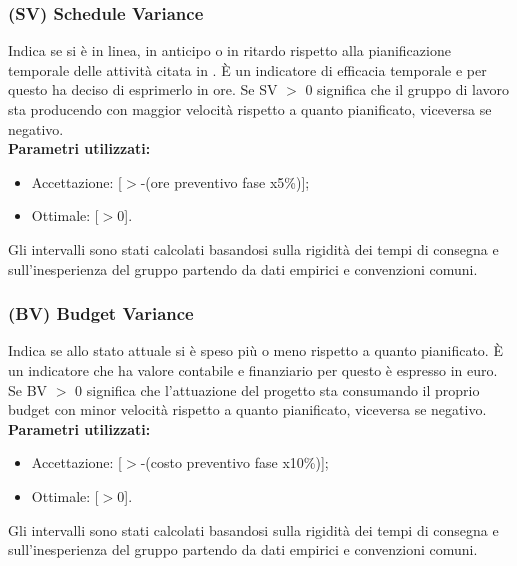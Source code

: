 \subsubsection{(SV) Schedule Variance}
Indica se si è in linea, in anticipo o in ritardo rispetto alla pianificazione temporale delle attività citata in \infoPDP.
È un indicatore di efficacia temporale e per questo \gruppo ha deciso di esprimerlo in ore.
Se SV $>$ 0 significa che il gruppo di lavoro sta producendo con maggior velocità rispetto a quanto pianificato, viceversa se negativo.\\
\textbf{Parametri utilizzati:}
\begin{itemize}
\item Accettazione: [$>$-(ore preventivo fase x5\%)];
\item Ottimale: [$>$0].
\end{itemize}
Gli intervalli sono stati calcolati basandosi sulla rigidità dei tempi di consegna e sull'inesperienza del gruppo partendo da dati empirici e convenzioni comuni.

\subsubsection{(BV) Budget Variance}
Indica se allo stato attuale si è speso più o meno rispetto a quanto pianificato.
È un indicatore che ha valore contabile e finanziario per questo è espresso in euro.
Se BV $>$ 0 significa che l’attuazione del progetto sta consumando il proprio budget con minor velocità rispetto a quanto pianificato, viceversa se negativo.
\textbf{Parametri utilizzati:}\\
\begin{itemize}
\item Accettazione: [$>$-(costo preventivo fase x10\%)];
\item Ottimale: [$>$0].
\end{itemize}
Gli intervalli sono stati calcolati basandosi sulla rigidità dei tempi di consegna e sull'inesperienza del gruppo partendo da dati empirici e convenzioni comuni.

